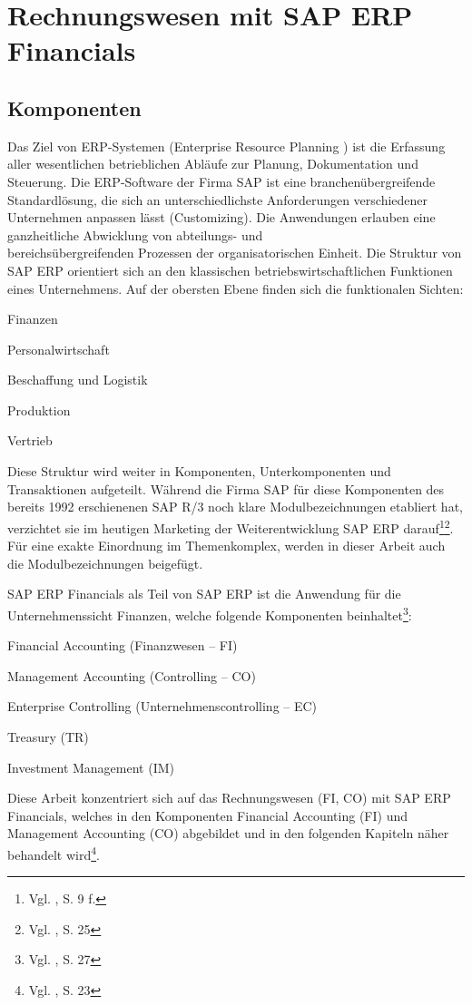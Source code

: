 \section{Rechnungswesen mit SAP ERP Financials}
\subsection{Komponenten}
Das Ziel von ERP-Systemen (Enterprise Resource Planning ) ist die Erfassung aller wesentlichen betrieblichen Abläufe zur Planung, Dokumentation und Steuerung. Die ERP-Software der Firma SAP ist eine branchenübergreifende Standardlösung, die sich an unterschiedlichste Anforderungen verschiedener Unternehmen anpassen lässt (Customizing). Die Anwendungen erlauben eine ganzheitliche Abwicklung von abteilungs- und\\bereichsübergreifenden Prozessen der organisatorischen Einheit. Die Struktur von SAP ERP orientiert sich an den klassischen betriebswirtschaftlichen Funktionen eines Unternehmens. Auf der obersten Ebene finden sich die funktionalen Sichten:
\begin{compactitem}
\item Finanzen
\item Personalwirtschaft
\item Beschaffung und Logistik
\item Produktion
\item Vertrieb
\end{compactitem}
Diese Struktur wird weiter in Komponenten, Unterkomponenten und Transaktionen aufgeteilt. Während die Firma SAP für diese Komponenten des bereits 1992 erschienenen SAP R/3 noch klare Modulbezeichnungen etabliert hat, verzichtet sie im heutigen Marketing der Weiterentwicklung SAP ERP darauf\footnote{Vgl. \cite{Klein2010}, S. 9 f.}\footnote{Vgl. \cite{Hefner2001}, S. 25}. Für eine exakte Einordnung im Themenkomplex, werden in dieser Arbeit auch die Modulbezeichnungen beigefügt.

SAP ERP Financials als Teil von SAP ERP ist die Anwendung für die Unternehmenssicht Finanzen, welche folgende Komponenten beinhaltet\footnote{Vgl. \cite{Hefner2001}, S. 27}:
\begin{compactitem}
\item Financial Accounting (Finanzwesen -- FI)
\item Management Accounting (Controlling -- CO)
\item Enterprise Controlling (Unternehmenscontrolling -- EC)
\item Treasury (TR)
\item Investment Management (IM)
\end{compactitem}
Diese Arbeit konzentriert sich auf das Rechnungswesen (FI, CO) mit SAP ERP Financials, welches in den Komponenten Financial Accounting (FI) und Management Accounting (CO) abgebildet und in den folgenden Kapiteln näher behandelt wird\footnote{Vgl. \cite{Patel2009}, S. 23}.

